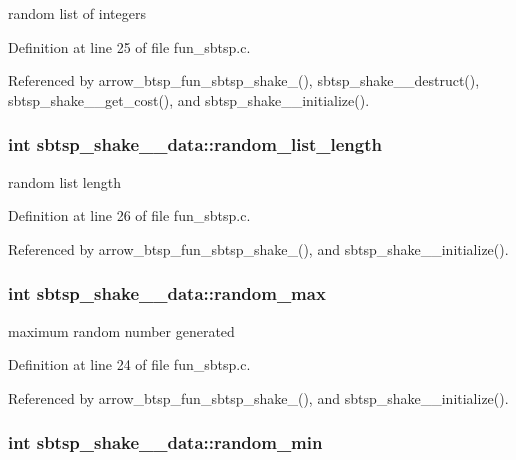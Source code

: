 random list of integers 

Definition at line 25 of file fun\_\-sbtsp.c.

Referenced by arrow\_\-btsp\_\-fun\_\-sbtsp\_\-shake\_(), sbtsp\_\-shake\_\_\-destruct(), sbtsp\_\-shake\_\_\-get\_\-cost(), and sbtsp\_\-shake\_\_\-initialize().\hypertarget{structsbtsp__shake__1__data_a74ff99394d80777bb57ec5560fb3d71}{
\subsubsection[{random\_\-list\_\-length}]{\setlength{\rightskip}{0pt plus 5cm}int {\bf sbtsp\_\-shake\_\_\-data::random\_\-list\_\-length}}}
\label{structsbtsp__shake__1__data_a74ff99394d80777bb57ec5560fb3d71}


random list length 

Definition at line 26 of file fun\_\-sbtsp.c.

Referenced by arrow\_\-btsp\_\-fun\_\-sbtsp\_\-shake\_(), and sbtsp\_\-shake\_\_\-initialize().\hypertarget{structsbtsp__shake__1__data_bfa7c0245c2d6e8f6f2f683078c6bcdf}{
\subsubsection[{random\_\-max}]{\setlength{\rightskip}{0pt plus 5cm}int {\bf sbtsp\_\-shake\_\_\-data::random\_\-max}}}
\label{structsbtsp__shake__1__data_bfa7c0245c2d6e8f6f2f683078c6bcdf}


maximum random number generated 

Definition at line 24 of file fun\_\-sbtsp.c.

Referenced by arrow\_\-btsp\_\-fun\_\-sbtsp\_\-shake\_(), and sbtsp\_\-shake\_\_\-initialize().\hypertarget{structsbtsp__shake__1__data_0ebb01b40f55ff2c48f39fcccbd4af80}{
\subsubsection[{random\_\-min}]{\setlength{\rightskip}{0pt plus 5cm}int {\bf sbtsp\_\-shake\_\_\-data::random\_\-min}}}
\label{structsbtsp__shake__1__data_0ebb01b40f55ff2c48f39fcccbd4af80}


